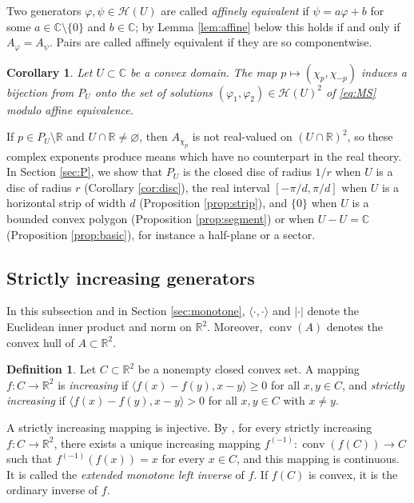 \documentclass[a4paper, reqno, 11pt]{amsart}
\newtheorem{Cor}[Thm]{Corollary}
\theoremstyle{definition}
\newtheorem{Def}[Thm]{Definition}
\begin{document}
Two generators $\varphi, \psi \in \mathcal{H}(U)$ are called {\it affinely equivalent} 
if $\psi = a\varphi + b$ for some $a \in \mathbb{C} \setminus \{0\}$ and $b \in \mathbb{C}$; by Lemma \ref{lem:affine} below this holds if and only if $A_{\varphi} = A_{\psi}$.
Pairs are called affinely equivalent if they are so componentwise.

\begin{Cor}\label{cor:bijection}
Let $U \subset \mathbb{C}$ be a convex domain.
The map $p \mapsto (\chi_p, \chi_{-p})$ induces a bijection from $P_U$ onto the set of solutions $(\varphi_1,\varphi_2) \in \mathcal{H}(U)^2$ of \eqref{eq:MS} modulo affine equivalence.
\end{Cor}

If $p \in P_U \setminus \mathbb{R}$ and $U\cap\mathbb{R}\neq\varnothing$, 
then $A_{\chi_p}$ is not real-valued on $(U\cap\mathbb{R})^2$, so these complex exponents produce means which have no counterpart in the real theory.
In Section \ref{sec:P}, we show that $P_U$ is the closed disc of radius $1/r$ when $U$ is a disc of radius $r$ (Corollary \ref{cor:disc}), the real interval $[-\pi/d, \pi/d]$ when $U$ is a horizontal strip of width $d$ (Proposition \ref{prop:strip}), and $\{0\}$ when $U$ is a bounded convex polygon (Proposition \ref{prop:segment}) or when $U - U = \mathbb{C}$ (Proposition \ref{prop:basic}), for instance a half-plane or a sector.

\subsection{Strictly increasing generators}\label{subsec:mon}

In this subsection and in Section \ref{sec:monotone}, $\langle \cdot, \cdot \rangle$ and $|\cdot|$ denote the Euclidean inner product and norm on $\mathbb{R}^2$. 
Moreover, $ \operatorname{conv} (A)$ denotes the convex hull of $A \subset \mathbb{R}^2$. 


\begin{Def}\label{def:increasing}
Let $C \subset \mathbb{R}^2$ be a nonempty closed convex set.
A mapping $f \colon C \to \mathbb{R}^2$ is {\it increasing} if $\langle f(x) - f(y), x - y \rangle \ge  0$ for all $x, y \in C$, and {\it strictly increasing} if $\langle f(x) - f(y), x - y \rangle > 0$ for all $x, y \in C$ with $x \neq y$.
\end{Def}

A strictly increasing mapping is injective.
By \cite[Theorems 2 and 3]{Toth}, for every strictly increasing $f \colon C \to \mathbb{R}^2$, there exists a unique increasing mapping $f^{(-1)} \colon \operatorname{conv} (f(C)) \to C$ such that $f^{(-1)}(f(x)) = x$ for every $x \in C$, and this mapping is continuous.
It is called the {\it extended monotone left inverse} of $f$. 
If $f(C)$ is convex, it is the ordinary inverse of $f$. 
\end{document}
